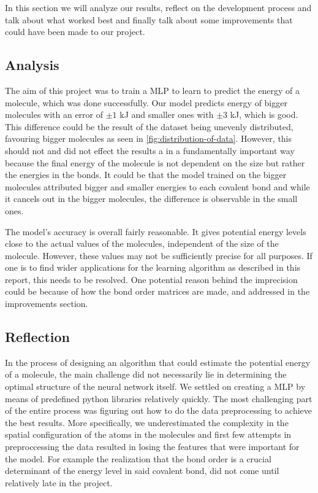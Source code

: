In this section we will analyze our results, reflect on the development process and talk about what worked best and finally talk about some improvements that could have been made to our project.


\subsection{Analysis}

The aim of this project was to train a MLP to learn to predict the energy of a molecule, which was done successfully. Our model predicts energy of bigger molecules with an error of $\pm 1$ kJ and smaller ones with $\pm 3$ kJ, which is good. This difference could be the result of the dataset being unevenly distributed, favouring bigger molecules as seen in \ref{fig:distribution-of-data}. However, this should not and did not effect the results a in a fundamentally important way because the final energy of the molecule is not dependent on the size but rather the energies in the bonds. It could be that the model trained on the bigger molecules attributed bigger and smaller energies to each covalent bond and while it cancels out in the bigger molecules, the difference is observable in the small ones.

The model's accuracy is overall fairly reasonable. It gives potential energy levels close to the actual values of the molecules, independent of the size of the molecule. However, these values may not be sufficiently precise for all purposes. If one is to find wider applications for the learning algorithm as described in this report, this needs to be resolved. One potential reason behind the imprecision could be because of how the bond order matrices are made, and addressed in the improvements section.

\subsection{Reflection}
In the process of designing an algorithm that could estimate the potential energy of a molecule, the main challenge did not necessarily lie in determining the optimal structure of the neural network itself. We settled on creating a MLP by means of predefined python libraries relatively quickly. The most challenging part of the entire process was figuring out how to do the data preprocessing to achieve the best results. More specifically, we underestimated the complexity in the spatial configuration of the atoms in the molecules and first few attempts in preproccessing the data resulted in losing the features that were important for the model. For example the realization that the bond order is a crucial determinant of the energy level in said covalent bond, did not come until relatively late in the project. 

